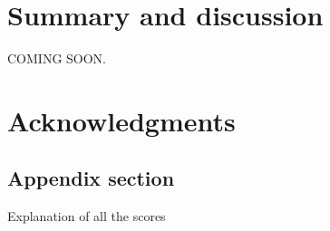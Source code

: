 \documentclass[article,shortnames]{jss}\usepackage[]{graphicx}\usepackage[]{color}
\begin{document}




\section{Summary and discussion} \label{sec:summary}

COMING SOON. 




\section*{Acknowledgments}








\newpage

\begin{appendix}

\section{Appendix section} \label{app:technical}

\begin{table}[h!]
\centering

\caption{\label{tab:score-table} Explanation of all the scores}
\end{table}


\end{appendix}

\end{document}
